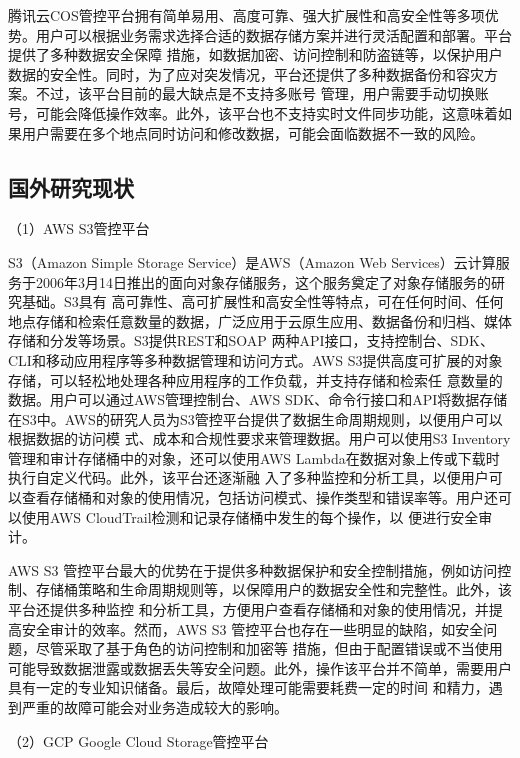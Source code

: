 腾讯云COS管控平台拥有简单易用、高度可靠、强大扩展性和高安全性等多项优势\cite{yuxiao}。用户可以根据业务需求选择合适的数据存储方案并进行灵活配置和部署。平台提供了多种数据安全保障
措施，如数据加密、访问控制和防盗链等，以保护用户数据的安全性。同时，为了应对突发情况，平台还提供了多种数据备份和容灾方案。不过，该平台目前的最大缺点是不支持多账号
管理，用户需要手动切换账号，可能会降低操作效率。此外，该平台也不支持实时文件同步功能，这意味着如果用户需要在多个地点同时访问和修改数据，可能会面临数据不一致的风险。

\subsection{国外研究现状} 

（1）AWS S3管控平台


S3（Amazon Simple Storage Service）是AWS（Amazon Web Services）云计算服务于2006年3月14日推出的面向对象存储服务\cite{y2xiao}，这个服务奠定了对象存储服务的研究基础。S3具有
高可靠性、高可扩展性和高安全性等特点，可在任何时间、任何地点存储和检索任意数量的数据，广泛应用于云原生应用、数据备份和归档、媒体存储和分发等场景。S3提供REST和SOAP
两种API接口，支持控制台、SDK、CLI和移动应用程序等多种数据管理和访问方式\cite{desmarais1992carbon}。AWS S3提供高度可扩展的对象存储，可以轻松地处理各种应用程序的工作负载，并支持存储和检索任
意数量的数据。用户可以通过AWS管理控制台、AWS SDK、命令行接口和API将数据存储在S3中。AWS的研究人员为S3管控平台提供了数据生命周期规则，以便用户可以根据数据的访问模
式、成本和合规性要求来管理数据。用户可以使用S3 Inventory管理和审计存储桶中的对象，还可以使用AWS Lambda在数据对象上传或下载时执行自定义代码。此外，该平台还逐渐融
入了多种监控和分析工具，以便用户可以查看存储桶和对象的使用情况，包括访问模式、操作类型和错误率等。用户还可以使用AWS CloudTrail检测和记录存储桶中发生的每个操作，以
便进行安全审计\cite{kongqingyong2eji}。


AWS S3 管控平台最大的优势在于提供多种数据保护和安全控制措施，例如访问控制、存储桶策略和生命周期规则等\cite{kong2ngyong2eji}，以保障用户的数据安全性和完整性。此外，该平台还提供多种监控
和分析工具，方便用户查看存储桶和对象的使用情况，并提高安全审计的效率。然而，AWS S3 管控平台也存在一些明显的缺陷，如安全问题，尽管采取了基于角色的访问控制和加密等
措施，但由于配置错误或不当使用可能导致数据泄露或数据丢失等安全问题。此外，操作该平台并不简单，需要用户具有一定的专业知识储备。最后，故障处理可能需要耗费一定的时间
和精力，遇到严重的故障可能会对业务造成较大的影响。

（2）GCP Google Cloud Storage管控平台

